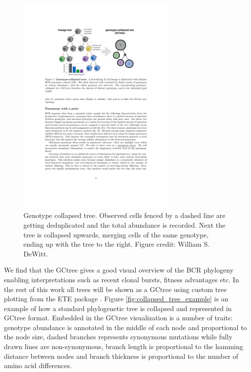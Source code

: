 \begin{figure}[!ht]
    \centering
    \includegraphics[width=0.7\textwidth]{figures/GCtree_illu.pdf}
    \caption{
        \label{fig:GCtree_illu}
        Genotype collapsed tree.
        Observed cells fenced by a dashed line are getting deduplicated and the total abundance is recorded.
        Next the tree is collapsed upwards, merging cells of the same genotype, ending up with the tree to the right.
        Figure credit: William S. DeWitt.
    }
\end{figure}


We find that the GCtree gives a good visual overview of the BCR phylogeny enabling interpretations such as recent clonal bursts, fitness advantages etc.
In the rest of this work all trees will be shown as a GCtree using custom tree plotting from the ETE package \cite{huerta2016ete}.
Figure \ref{fig:collapsed_tree_example} is an example of how a standard phylogenetic tree is collapsed and represented in GCtree format.
Embedded in the GCtree visualization is a number of traits: genotype abundance is annotated in the middle of each node and proportional to the node size, dashed branches represents synonymous mutations while fully drawn lines are non-synonymous, branch length is proportional to the hamming distance between nodes and branch thickness is proportional to the number of amino acid differences.

